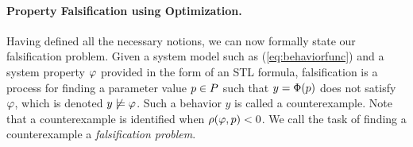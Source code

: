 


\paragraph{Property Falsification using Optimization.}	

Having defined all the necessary notions, we can now formally state our falsification problem.
Given a system model such as (\ref{eq:behaviorfunc}) and a system property $\varphi$ provided in the form of an STL formula, 
falsification is a process for finding a parameter value $p \in P$
such that $y=\Phi(p)$ does not satisfy $\varphi$, which is denoted $y
\not\models \varphi$. Such a behavior $y$ is called a counterexample. 
Note that a counterexample is identified when 
$\rho(\varphi,p)<0$. We call the task of finding a counterexample 
a {\em falsification problem}. 


